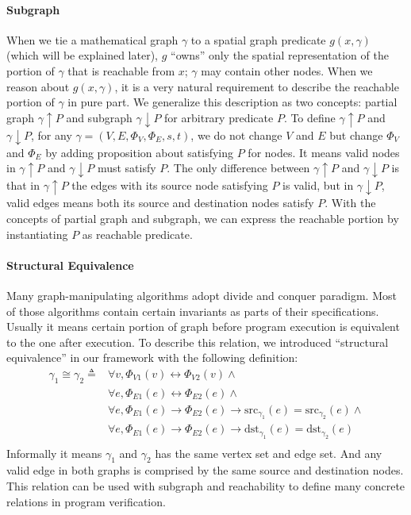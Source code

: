 \paragraph{Subgraph}
When we tie a mathematical graph $\gamma$ to a spatial graph predicate
$g(x, \gamma)$ (which will be explained later), $g$ ``owns'' only the
spatial representation of the portion of $\gamma$ that is reachable
from $x$; $\gamma$ may contain other nodes. When we reason about
$g(x, \gamma)$, it is a very natural requirement to describe the
reachable portion of $\gamma$ in pure part. We generalize this
description as two concepts: partial graph $\gamma \!\uparrow\! P$ and
subgraph $\gamma \!\downarrow\! P$ for arbitrary predicate $P$. To define
$\gamma \!\uparrow\! P$ and $\gamma \!\downarrow\! P$, for any $\gamma=(V,
E, \Phi_V, \Phi_E, s, t)$, we do not change $V$ and $E$ but change
$\Phi_V$ and $\Phi_E$ by adding proposition about satisfying $P$ for
nodes. It means valid nodes in $\gamma \!\uparrow\! P$ and
$\gamma \!\downarrow\! P$ must satisfy $P$. The only difference between
$\gamma \!\uparrow\! P$ and $\gamma \!\downarrow\! P$ is that in
$\gamma \!\uparrow\! P$ the edges with its source node satisfying $P$ is
valid, but in $\gamma \!\downarrow\! P$, valid edges means both its source
and destination nodes satisfy $P$. With the concepts of partial graph
and subgraph, we can express the reachable portion by instantiating
$P$ as reachable predicate.

\paragraph{Structural Equivalence}
Many graph-manipulating algorithms adopt divide and conquer
paradigm. Most of those algorithms contain certain invariants as parts
of their specifications. Usually it means certain portion of graph
before program execution is equivalent to the one after execution. To
describe this relation, we introduced ``structural equivalence'' in
our framework with the following definition:
\begin{equation*}
\begin{split}
\gamma_1 \cong\gamma_2 \triangleq & \forall v, \Phi_{V1}(v) \leftrightarrow \Phi_{V2}(v) \wedge \\
& \forall e, \Phi_{E1}(e) \leftrightarrow \Phi_{E2}(e) \wedge\\
& \forall e, \Phi_{E1}(e) \rightarrow \Phi_{E2}(e) \rightarrow \text{src}_{\gamma_1}(e)=\text{src}_{\gamma_2}(e) \wedge\\
& \forall e, \Phi_{E1}(e) \rightarrow \Phi_{E2}(e) \rightarrow \text{dst}_{\gamma_1}(e)=\text{dst}_{\gamma_2}(e)\\
\end{split}
\end{equation*}
Informally it means $\gamma_1$ and $\gamma_2$ has the same vertex set
and edge set. And any valid edge in both graphs is comprised by the
same source and destination nodes. This relation can be used with
subgraph and reachability to define many concrete relations in program
verification.

